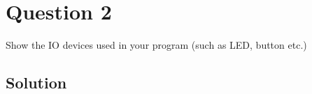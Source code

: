 \section*{Question 2}

Show the IO devices used in your program (such as LED, button etc.)

\subsection*{Solution}
